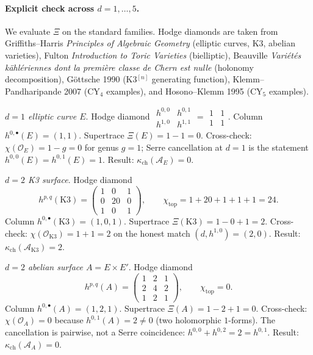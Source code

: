 \paragraph{Explicit check across $d = 1, \ldots, 5$.} We evaluate
$\Xi$ on the standard families. Hodge diamonds are taken from
Griffiths--Harris \emph{Principles of Algebraic Geometry} (elliptic
curves, K3, abelian varieties), Fulton \emph{Introduction to Toric
Varieties} (bielliptic), Beauville \emph{Vari\'et\'es k\"ahl\'eriennes
dont la premi\`ere classe de Chern est nulle} (holonomy
decomposition), G\"ottsche 1990 (K3$^{[n]}$ generating function),
Klemm--Pandharipande 2007 (CY$_4$ examples), and Hosono--Klemm 1995
(CY$_5$ examples).

\emph{$d = 1$ elliptic curve $E$}. Hodge diamond
\(
  \begin{smallmatrix}
    h^{0,0} & h^{0,1} \\
    h^{1,0} & h^{1,1}
  \end{smallmatrix}
  =
  \begin{smallmatrix}
    1 & 1 \\
    1 & 1
  \end{smallmatrix}
\). Column $h^{0, \bullet}(E) = (1, 1)$. Supertrace
$\Xi(E) = 1 - 1 = 0$. Cross-check: $\chi(\mathcal{O}_E) = 1 - g = 0$
for genus $g = 1$; Serre cancellation at $d = 1$ is the statement
$h^{0, 0}(E) = h^{0, 1}(E) = 1$. Result:
$\kappa_{\mathrm{ch}}(\mathcal{A}_E) = 0$.

\emph{$d = 2$ K3 surface}. Hodge diamond
\[
 h^{p, q}(\mathrm{K3}) =
 \begin{pmatrix}
    1 & 0  & 1 \\
    0 & 20 & 0 \\
    1 & 0  & 1
 \end{pmatrix}, \qquad
 \chi_{\mathrm{top}} = 1 + 20 + 1 + 1 + 1 = 24.
\]
Column $h^{0, \bullet}(\mathrm{K3}) = (1, 0, 1)$. Supertrace
$\Xi(\mathrm{K3}) = 1 - 0 + 1 = 2$. Cross-check:
$\chi(\mathcal{O}_{\mathrm{K3}}) = 1 + 1 = 2$ on the honest match
$(d, h^{1, 0}) = (2, 0)$. Result:
$\kappa_{\mathrm{ch}}(\mathcal{A}_{\mathrm{K3}}) = 2$.

\emph{$d = 2$ abelian surface $A = E \times E'$}. Hodge diamond
\[
 h^{p, q}(A) =
 \begin{pmatrix}
    1 & 2 & 1 \\
    2 & 4 & 2 \\
    1 & 2 & 1
 \end{pmatrix}, \qquad
 \chi_{\mathrm{top}} = 0.
\]
Column $h^{0, \bullet}(A) = (1, 2, 1)$. Supertrace
$\Xi(A) = 1 - 2 + 1 = 0$. Cross-check: $\chi(\mathcal{O}_A) = 0$
because $h^{0, 1}(A) = 2 \neq 0$ (two holomorphic $1$-forms). The
cancellation is pairwise, not a Serre coincidence: $h^{0, 0} +
h^{0, 2} = 2 = h^{0, 1}$. Result:
$\kappa_{\mathrm{ch}}(\mathcal{A}_A) = 0$.

